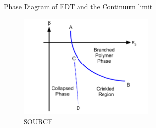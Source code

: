 
\begin{frame}{Phase Diagram of EDT and the Continuum limit}
 \begin{figure}
  \includegraphics[width=0.6\textwidth]{pics/phase-diagram}
  \caption{SOURCE}
 \end{figure}
\end{frame}

